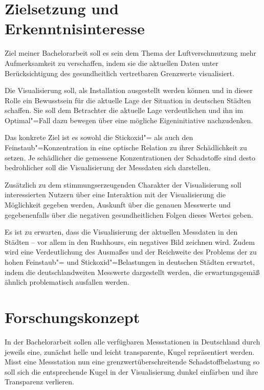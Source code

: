 \documentclass[12pt]{article} %
\begin{document}
\section{Zielsetzung und Erkenntnisinteresse} \label{sec:Zielsetzung}

Ziel meiner Bachelorarbeit soll es sein dem Thema der Luftverschmutzung mehr Aufmerksamkeit zu verschaffen, indem sie die aktuellen Daten unter Berücksichtigung des gesundheitlich vertretbaren Grenzwerte visualisiert.

Die Visualisierung soll, als Installation ausgestellt werden können und in dieser Rolle ein Bewusstsein für die aktuelle Lage der Situation in deutschen Städten schaffen.
Sie soll dem Betrachter die aktuelle Lage verdeutlichen und ihn im Optimal"=Fall dazu bewegen über eine mögliche Eigeninitiative nachzudenken.

Das konkrete Ziel ist es sowohl die Stickoxid"= als auch den Feinstaub"=Konzentration in eine optische Relation zu ihrer Schädlichkeit zu setzen. 
Je schädlicher die gemessene Konzentrationen der Schadstoffe sind desto bedrohlicher soll die Visualisierung der Messdaten sich darstellen.

Zusätzlich zu dem stimmungserzeugenden Charakter der Visualisierung soll interessierten Nutzern über eine Interaktion mit der Visualisierung die Möglichkeit gegeben werden, Auskunft über die genauen Messwerte und gegebenenfalls über die negativen gesundheitlichen Folgen dieses Wertes geben.

Es ist zu erwarten, dass die Visualisierung der aktuellen Messdaten in den Städten – vor allem in den Rushhours, ein negatives Bild zeichnen wird.
Zudem wird eine Verdeutlichung des Ausmaßes und der Reichweite des Problems der zu hohen Feinstaub"= und Stickoxid"=Belastungen in deutschen Städten erwartet, indem die deutschlandweiten Messwerte dargestellt werden, die erwartungsgemäß ähnlich problematisch ausfallen werden.

\section{Forschungskonzept} \label{sec:Forschungskonzept}

In der Bachelorarbeit sollen alle verfügbaren Messstationen in Deutschland durch jeweils eine, zunächst helle und leicht transparente, Kugel repräsentiert werden.
Misst eine Messstation nun eine grenzwertüberschreitende Schadstoffbelastung so soll sich die entsprechende Kugel in der Visualisierung dunkel einfärben und ihre Transparenz verlieren.
   
\end{document}
